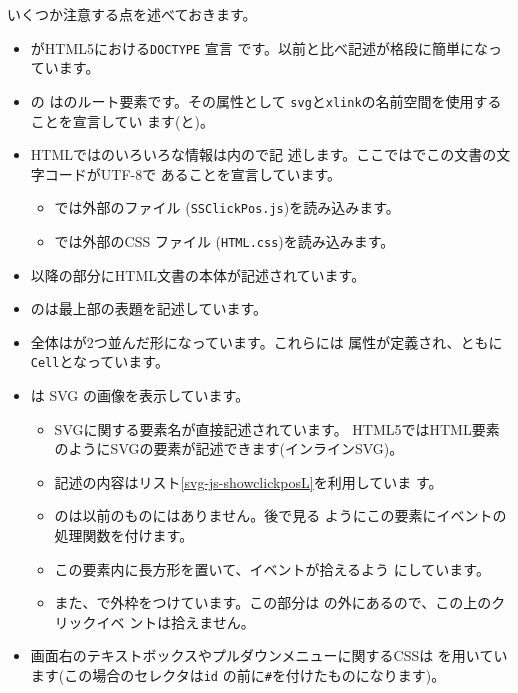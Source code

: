 いくつか注意する点を述べておきます。
\begin{itemize}
 \item {}がHTML5における\texttt{DOCTYPE} 宣言
       です。以前と比べ記述が格段に簡単になっています。
 \item \HTML の は\HTML のルート要素です。その属性として
       \texttt{svg}と\texttt{xlink}の名前空間を使用することを宣言してい
       ます(と)。
  \item HTMLでは\HTML のいろいろな情報は内ので記
	述します。ここではでこの文書の文字コードがUTF-8で
        あることを宣言しています。
        \begin{itemize}
         \item {}では外部の\JS ファイル
               (\texttt{SSClickPos.js})を読み込みます。
         \item {}では外部のCSS ファイル
               (\texttt{HTML.css})を読み込みます。
        \end{itemize}
 \item {}以降の部分にHTML文書の本体が記述されています。
 \item {}のは最上部の表題を記述しています。
 \item 全体はが2つ並んだ形になっています。これらには
       属性が定義され、ともに\texttt{Cell}となっています。
 \item {}は SVG の画像を表示しています。
       \begin{itemize}
        \item SVGに関する要素名が直接記述されています。
              HTML5ではHTML要素のようにSVGの要素が記述できます(インラインSVG)。
        \item 記述の内容はリスト\ref{svg-js-showclickposL}を利用していま
              す。
        \item {}のは以前のものにはありません。後で見る
              ようにこの要素にイベントの処理関数を付けます。
        \item この要素内に長方形を置いて、イベントが拾えるよう
              にしています。
        \item また、で外枠をつけています。この部分は
              の外にあるので、この上のクリックイベ
              ントは拾えません。
       \end{itemize}
 \item 画面右のテキストボックスやプルダウンメニューに関するCSSは
       を用いています(この場合の{セレクタ}は\texttt{id}
       の前に\texttt{\#}を付けたものになります)。
\end{itemize}
